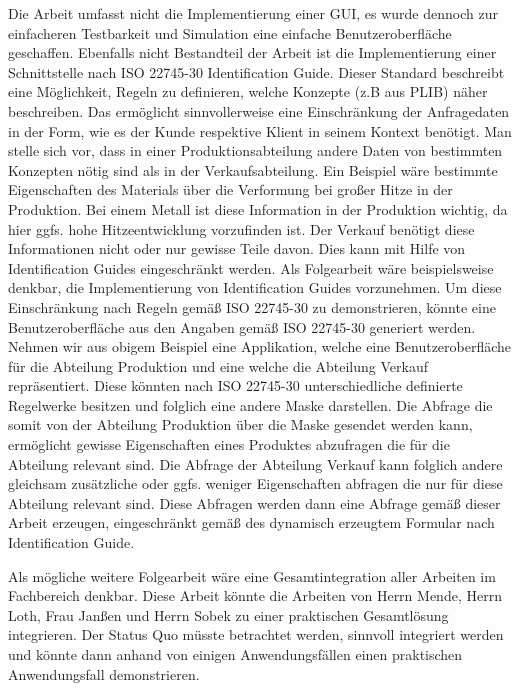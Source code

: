 Die Arbeit umfasst nicht die Implementierung einer GUI, es wurde dennoch zur einfacheren Testbarkeit und Simulation eine einfache Benutzeroberfläche geschaffen. Ebenfalls nicht Bestandteil der Arbeit ist die Implementierung einer Schnittstelle nach ISO 22745-30 Identification Guide. Dieser Standard beschreibt eine Möglichkeit, Regeln zu definieren, welche Konzepte (z.B aus \gls{PLIB}) näher beschreiben. Das ermöglicht sinnvollerweise eine Einschränkung der Anfragedaten in der Form, wie es der Kunde respektive Klient in seinem Kontext benötigt. Man stelle sich vor, dass in einer Produktionsabteilung andere Daten von bestimmten Konzepten nötig sind als in der Verkaufsabteilung. Ein Beispiel wäre bestimmte Eigenschaften des Materials über die Verformung bei großer Hitze in der Produktion. Bei einem Metall ist diese Information in der Produktion wichtig, da hier ggfs. hohe Hitzeentwicklung vorzufinden ist. Der Verkauf benötigt diese Informationen nicht oder nur gewisse Teile davon. Dies kann mit Hilfe von Identification Guides eingeschränkt werden. 
Als Folgearbeit wäre beispielsweise denkbar, die Implementierung von Identification Guides vorzunehmen. Um diese Einschränkung nach Regeln gemäß ISO 22745-30 zu demonstrieren, könnte eine Benutzeroberfläche aus den Angaben gemäß ISO 22745-30 generiert werden. Nehmen wir aus obigem Beispiel eine Applikation, welche eine Benutzeroberfläche für die Abteilung Produktion und eine welche die Abteilung Verkauf repräsentiert. Diese könnten nach ISO 22745-30 unterschiedliche definierte Regelwerke besitzen und folglich eine andere Maske darstellen. Die Abfrage die somit von der Abteilung Produktion über die Maske gesendet werden kann, ermöglicht gewisse Eigenschaften eines Produktes abzufragen die für die Abteilung relevant sind. Die Abfrage der Abteilung Verkauf kann folglich andere gleichsam zusätzliche oder ggfs. weniger Eigenschaften abfragen die nur für diese Abteilung relevant sind. Diese Abfragen werden dann eine Abfrage gemäß dieser Arbeit erzeugen, eingeschränkt gemäß des dynamisch erzeugtem Formular nach Identification Guide. 

Als mögliche weitere Folgearbeit wäre eine Gesamtintegration aller Arbeiten im Fachbereich denkbar. Diese Arbeit könnte die Arbeiten von Herrn Mende, Herrn Loth, Frau Janßen und Herrn Sobek zu einer praktischen Gesamtlösung integrieren. 
Der Status Quo müsste betrachtet werden, sinnvoll integriert werden und könnte dann anhand von einigen Anwendungsfällen einen praktischen Anwendungsfall demonstrieren.   
